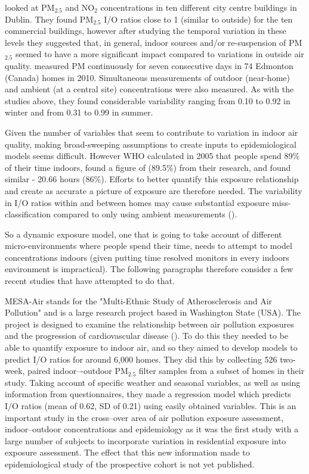 \cite{Challoner2014} looked at PM$_{2.5}$ and NO$_{2}$ concentrations in ten different city centre buildings in Dublin. They found PM$_{2.5}$ I/O ratios close to 1 (similar to outside) for the ten commercial buildings, however after studying the temporal variation in these levels they suggested that, in general, indoor sources and/or re-suspension of PM$_{2.5}$ seemed to have a more significant impact compared to variations in outside air quality. \cite{Kearney2014} measured PM continuously for seven consecutive days in 74 Edmonton (Canada) homes in 2010. Simultaneous measurements of outdoor (near-home) and ambient (at a central site) concentrations were also measured. As with the studies above, they found considerable variability ranging from 0.10 to 0.92 in winter and from 0.31 to 0.99 in summer.

Given the number of variables that seem to contribute to variation in indoor air quality, making broad-sweeping assumptions to create inputs to epidemiological models seems difficult. However WHO calculated in 2005 that people spend 89\% of their time indoors, \cite{Lai2004a} found a figure of (89.5\%) from their research, and \cite{Schweizer2007} found similar - 20.66 hours (86\%). Efforts to better quantify this exposure relationship and create as accurate a picture of exposure are therefore needed. The variability in I/O ratios within and between homes may cause substantial exposure miss-classification compared to only using ambient measurements (\cite{Kearney2014}).

So a dynamic exposure model, one that is going to take account of different micro-environments where people spend their time, needs to attempt to model concentrations indoors (given putting time resolved monitors in every indoors environment is impractical). The following paragraphs therefore consider a few recent studies that have attempted to do that.

MESA-Air stands for the "Multi-Ethnic Study of Atherosclerosis and Air Pollution" and is a large research project based in Washington State (USA). The project is designed to examine the relationship between air pollution exposures and the progression of cardiovascular disease (\cite{Allen2012}). To do this they needed to be able to quantify exposure to indoor air, and so they aimed to develop models to predict I/O ratios for around 6,000 homes. They did this by collecting 526 two-week, paired indoor–-outdoor PM$_{2.5}$ filter samples from a subset of homes in their study. Taking account of specific weather and seasonal variables, as well as using information from questionnaires, they made a regression model which predicts I/O ratios (mean of 0.62, SD of  0.21) using easily obtained variables. This is an important study in the cross--over area of air pollution exposure assessment, indoor--outdoor concentrations and epidemiology as it was the first study with a large number of subjects to incorporate variation in residential exposure into exposure assessment. The effect that this new information made to epidemiological study of the prospective cohort is not yet published.

